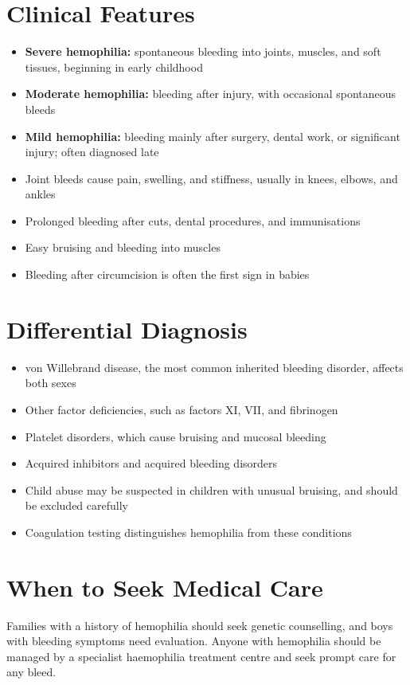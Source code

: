 \section*{Clinical Features}
\begin{itemize}
    \item \textbf{Severe hemophilia:} spontaneous bleeding into joints, muscles, and soft tissues, beginning in early childhood
    \item \textbf{Moderate hemophilia:} bleeding after injury, with occasional spontaneous bleeds
    \item \textbf{Mild hemophilia:} bleeding mainly after surgery, dental work, or significant injury; often diagnosed late
    \item Joint bleeds cause pain, swelling, and stiffness, usually in knees, elbows, and ankles
    \item Prolonged bleeding after cuts, dental procedures, and immunisations
    \item Easy bruising and bleeding into muscles
    \item Bleeding after circumcision is often the first sign in babies
\end{itemize}

\section*{Differential Diagnosis}
\begin{itemize}
    \item von Willebrand disease, the most common inherited bleeding disorder, affects both sexes
    \item Other factor deficiencies, such as factors XI, VII, and fibrinogen
    \item Platelet disorders, which cause bruising and mucosal bleeding
    \item Acquired inhibitors and acquired bleeding disorders
    \item Child abuse may be suspected in children with unusual bruising, and should be excluded carefully
    \item Coagulation testing distinguishes hemophilia from these conditions
\end{itemize}

\section*{When to Seek Medical Care}
Families with a history of hemophilia should seek genetic counselling, and boys with bleeding symptoms need evaluation. Anyone with hemophilia should be managed by a specialist haemophilia treatment centre and seek prompt care for any bleed.

